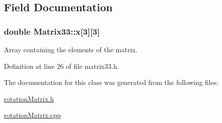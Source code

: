 \subsection{\-Field \-Documentation}
\hypertarget{classMatrix33_af7f01fa466616eb7c8eda2e4d9f85cdd}{
\subsubsection[{x}]{\setlength{\rightskip}{0pt plus 5cm}double {\bf \-Matrix33\-::x}\mbox{[}3\mbox{]}\mbox{[}3\mbox{]}}}\label{de/d82/classMatrix33_af7f01fa466616eb7c8eda2e4d9f85cdd}


\-Array containing the elements of the matrix. 



\-Definition at line 26 of file matrix33.\-h.



\-The documentation for this class was generated from the following files\-:\begin{DoxyCompactItemize}
\item 
\hyperlink{rotationMatrix_8h}{rotation\-Matrix.\-h}\item 
\hyperlink{rotationMatrix_8cpp}{rotation\-Matrix.\-cpp}\end{DoxyCompactItemize}
